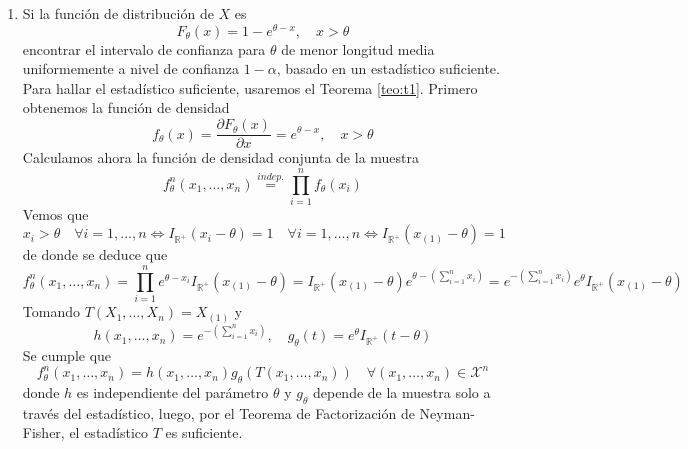 \documentclass[12pt]{article}
\newcommand{\R}{\mathbb{R}}
\newcommand{\Rmas}{\R^{+}}
\newcommand{\X}{\mathcal{X}}
\begin{document}
\begin{ejercicio}[2,25 puntos]
\begin{enumerate}
            \item[b)] Si la función de distribución de $X$ es $$F_\theta(x)=1-e^{\theta - x}, \quad x>\theta$$
            encontrar el intervalo de confianza para $\theta$ de menor longitud media
            uniformemente a nivel de confianza $1-\alpha$, basado en un estadístico suficiente. \\

            Para hallar el estadístico suficiente,
            usaremos el Teorema \ref{teo:t1}. Primero obtenemos la función de densidad 
            $$f_\theta(x) = \dfrac{\partial F_\theta(x)}{\partial x} = e^{\theta - x}, \quad x > \theta$$
            Calculamos ahora la función de densidad conjunta de la muestra
            $$f^n_\theta(x_1, \ldots, x_n) \stackrel{indep.}{=} \prod_{i=1}^{n} f_\theta(x_i)$$
            Vemos que 
            $$x_i > \theta \quad \forall i = 1, \ldots, n \iff I_{\Rmas}(x_i - \theta) = 1 \quad \forall i = 1, \ldots, n \iff I_{\Rmas}(x_{(1)} - \theta) = 1$$ de donde se deduce que 
            $$f^n_\theta(x_1, \ldots, x_n) = \prod_{i=1}^{n} e^{\theta - x_i} I_{\Rmas}(x_{(1)} - \theta) = 
            I_{\Rmas}(x_{(1)} - \theta) e^{\theta - \left( \displaystyle\sum_{i=1}^{n} x_i \right)} = e^{- \left( \displaystyle\sum_{i=1}^{n} x_i \right)} e^{\theta} I_{\Rmas}(x_{(1)} - \theta) $$
            Tomando $T(X_1, \ldots, X_n) = X_{(1)}$ y 
            $$h(x_1, \ldots, x_n) = e^{- \left( \displaystyle\sum_{i=1}^{n} x_i \right)}, \quad g_\theta(t) = e^{\theta} I_{\Rmas}(t - \theta)$$
            Se cumple que 
            $$f^n_\theta(x_1, \ldots, x_n) = h(x_1, \ldots, x_n) g_\theta(T(x_1, \ldots, x_n)) \quad \forall (x_1, \ldots, x_n) \in \X^n$$
            donde $h$ es independiente del parámetro $\theta$ y $g_\theta$ depende de la muestra solo a través del estadístico, luego,
            por el Teorema de Factorización de Neyman-Fisher, el estadístico $T$ es suficiente.


\end{enumerate}
\end{ejercicio}
\end{document}
